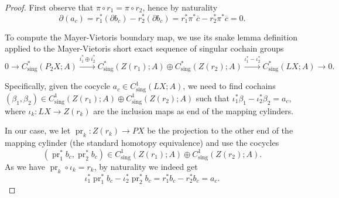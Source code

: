 \documentclass[a4paper,twoside]{article}
\theoremstyle{plain}
\theoremstyle{definition}
\theoremstyle{remark}
\newcommand{\boundary}[1]{\partial#1}
\DeclareMathOperator{\sing}{sing}
\DeclareMathOperator{\pr}{pr}
\begin{document}
\begin{proof}
  First observe that $\pi\circ r_1=\pi\circ r_2$, hence by naturality
  \begin{equation*}
    \boundary(a_c) =r_1^*(\boundary b_c)-r_2^*(\boundary b_c) =
    r_1^*\pi^*\overline c - r_2^*\pi^*\overline c =0.
  \end{equation*}

  To compute the Mayer-Vietoris boundary map, we use its snake lemma
  definition applied to the Mayer-Vietoris short exact sequence of singular cochain groups
  {\small
    \begin{equation*}
  0 \to C^*_{\sing}(P_2X;A) \xrightarrow{i_1^*\oplus i_2^*}
  C^*_{\sing}(Z(r_1);A)\oplus C^*_{\sing}(Z(r_2);A) \xrightarrow{ \iota_1^*
    -\iota_2^*} C^*_{\sing}(LX;A) \to 0.
\end{equation*}
}

Specifically, given the cocycle $a_c\in C^1_{\sing}(LX;A)$, we need to find
  cochains $(\beta_1,\beta_2)\in C^1_{\sing}(Z(r_1);A)\oplus
  C^1_{\sing}(Z(r_2);A)$ such that $\iota_1^*\beta_1 - \iota_2^*\beta_2 =
  a_c$, where $\iota_k\colon LX\to Z(r_k)$ are the
  inclusion maps as end of the mapping cylinders.

  In our case, we let $\pr_k\colon Z(r_k)\to PX$ be the projection to the
  other end of the mapping cylinder (the standard homotopy equivalence) and
  use the cocycles
  \begin{equation*}
(\pr_1^*b_c,\pr_2^*b_c)\in C^1_{\sing}(Z(r_1);A)\oplus
  C^1_{\sing}(Z(r_2);A).
\end{equation*}
As we have $\pr_k\circ\iota_k = r_k$, by naturality we indeed get
\begin{equation*}
\iota_1^*\pr_1^*b_c- \iota_2^*\pr_2^*b_c= r_1^*b_c-r_2^*b_c = a_c.
\end{equation*}



\end{proof}
\end{document}
